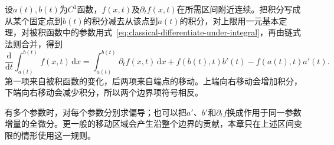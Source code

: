 设$a(t),b(t)$为$C^1$函数，$f(x,t)$及$\partial_tf(x,t)$在所需区间附近连续。把积分写成从某个固定点到$b(t)$的积分减去从该点到$a(t)$的积分，对上限用一元基本定理，对被积函数中的参数用式~\eqref{eq:classical-differentiate-under-integral}，再由链式法则合并，得到
\[
 \frac{\mathrm d}{\mathrm dt}\int_{a(t)}^{b(t)}f(x,t)\,\mathrm dx
 =\int_{a(t)}^{b(t)}\partial_tf(x,t)\,\mathrm dx
 +f(b(t),t)b'(t)-f(a(t),t)a'(t).
\]
第一项来自被积函数的变化，后两项来自端点的移动。上端向右移动会增加积分，下端向右移动会减少积分，所以两个边界项符号相反。

有多个参数时，对每个参数分别求偏导；也可以把$a'$、$b'$和$\partial_tf$换成作用于同一参数增量的全微分。更一般的移动区域会产生沿整个边界的贡献，本章只在上述区间变限的情形使用这一规则。
